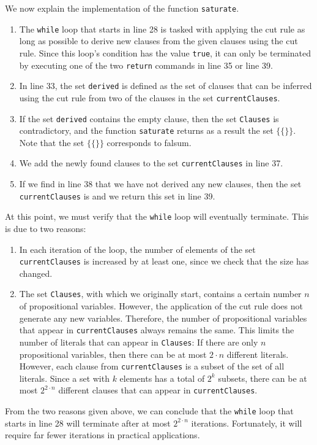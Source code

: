 We now explain the implementation of the function \texttt{saturate}.
\begin{enumerate}
\item The \texttt{while} loop that starts in line 28 is tasked with applying the cut rule
      as long as possible to derive new clauses from the given
      clauses using the cut rule. Since this loop's condition has the value \texttt{true}, it can only be
      terminated by executing one of the two \texttt{return} commands in line 35 or line 39.
\item In line 33, the set \texttt{derived} is defined as the set of clauses that can be inferred using the
      cut rule from two of the clauses in the set \texttt{currentClauses}.
\item If the set \texttt{derived} contains the empty clause, then the set
      \texttt{Clauses} is contradictory, and the function \texttt{saturate} returns as a result the
      set $\bigl\{ \{\} \bigr\}$. Note that the set $\bigl\{ \{\} \bigr\}$ corresponds to falsum.
\item We add the newly found clauses to the set \texttt{currentClauses} in line 37.
\item If we find in line 38 that we have not derived any new clauses,
      then the set \texttt{currentClauses} is  and we return this set in line 39.
\end{enumerate}
At this point, we must verify that the \texttt{while} loop will eventually
terminate. This is due to two reasons:
\begin{enumerate}
\item In each iteration of the loop, the number of elements of the set \texttt{currentClauses}
      is increased by at least one, since we check that the size has changed.
\item The set \texttt{Clauses}, with which we originally start, contains a certain number $n$
      of propositional variables. However, the application of the cut rule does not generate any new
      variables. Therefore, the number of propositional variables that appear in
      \texttt{currentClauses} always remains the same. This limits the number of literals
      that can appear in \texttt{Clauses}: If there are only $n$ propositional variables,
      then there can be at most $2 \cdot n$ different literals.  However, each clause from \texttt{currentClauses} is
      a subset of the set of all literals.  Since a set with $k$ elements has a total of $2^k$
      subsets, there can be at most $2^{2 \cdot n}$ different clauses that can appear in
      \texttt{currentClauses}.
\end{enumerate}
From the two reasons given above, we can conclude that the \texttt{while} loop that starts in
line 28 will terminate after at most $2^{2 \cdot n}$ iterations.  Fortunately, it will require far fewer
iterations in practical applications.



